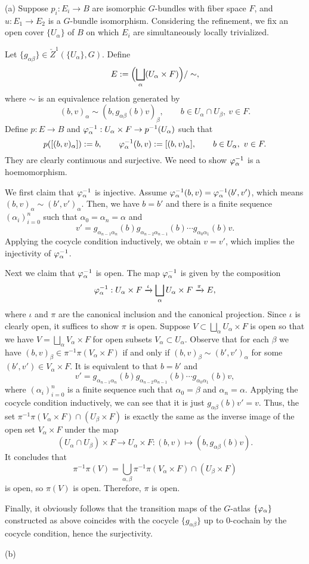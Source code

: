 \documentclass{../../large}
\begin{document}
\begin{pf}
(a)
Suppose $p_i:E_i\to B$ are isomorphic $G$-bundles with fiber space $F$, and $u:E_1\to E_2$ is a $G$-bundle isomorphism.
Considering the refinement, we fix an open cover $\{U_\alpha\}$ of $B$ on which $E_i$ are simultaneously locally trivialized.

Let $\{g_{\alpha\beta}\}\in\check Z^1(\{U_\alpha\},G)$.
Define
\[E:=\Bigl(\bigsqcup_\alpha(U_\alpha\times F)\Bigr)/\sim,\]
where $\sim$ is an equivalence relation generated by
\[(b,v)_\alpha\sim(b,g_{\alpha\beta}(b)v)_\beta,
\qquad b\in U_\alpha\cap U_\beta,\ v\in F.\]
Define $p:E\to B$ and $\varphi_\alpha^{-1}:U_\alpha\times F\to p^{-1}(U_\alpha)$ such that
\[p([(b,v)_\alpha]):=b,\qquad\varphi_\alpha^{-1}(b,v):=[(b,v)_\alpha],\qquad b\in U_\alpha,\ v\in F.\]
They are clearly continuous and surjective.
We need to show $\varphi_\alpha^{-1}$ is a hoemomorphism.

We first claim that $\varphi_\alpha^{-1}$ is injective.
Assume $\varphi_\alpha^{-1}(b,v)=\varphi_\alpha^{-1}(b',v')$, which means $(b,v)_\alpha\sim(b',v')_\alpha$.
Then, we have $b=b'$ and there is a finite sequence $(\alpha_i)_{i=0}^n$ such that $\alpha_0=\alpha_n=\alpha$ and
\[v'=g_{\alpha_{n-1}\alpha_n}(b)g_{\alpha_{n-2}\alpha_{n-1}}(b)\cdots g_{\alpha_0\alpha_1}(b)v.\]
Applying the cocycle condition inductively, we obtain $v=v'$, which implies the injectivity of $\varphi_\alpha^{-1}$.

Next we claim that $\varphi_\alpha^{-1}$ is open.
The map $\varphi_\alpha^{-1}$ is given by the composition
\[\varphi_\alpha^{-1}:U_\alpha\times F\xrightarrow{\iota}\bigsqcup_\alpha U_\alpha\times F\xrightarrow{\pi}E,\]
where $\iota$ and $\pi$ are the canonical inclusion and the canonical projection.
Since $\iota$ is clearly open, it suffices to show $\pi$ is open.
Suppose $V\subset\bigsqcup_\alpha U_\alpha\times F$ is open so that we have $V=\bigsqcup_\alpha V_\alpha\times F$ for open subsets $V_\alpha\subset U_\alpha$.
Observe that for each $\beta$ we have $(b,v)_\beta\in\pi^{-1}\pi(V_\alpha\times F)$ if and only if $(b,v)_\beta\sim(b',v')_\alpha$ for some $(b',v')\in V_\alpha\times F$.
It is equivalent to that $b=b'$ and 
\[v'=g_{\alpha_{n-1}\alpha_n}(b)g_{\alpha_{n-2}\alpha_{n-1}}(b)\cdots g_{\alpha_0\alpha_1}(b)v,\]
where $(\alpha_i)_{i=0}^n$ is a finite sequence such that $\alpha_0=\beta$ and $\alpha_n=\alpha$.
Applying the cocycle condition inductively, we can see that it is just $g_{\alpha\beta}(b)v'=v$.
Thus, the set $\pi^{-1}\pi(V_\alpha\times F)\cap(U_\beta\times F)$ is exactly the same as the inverse image of the open set $V_\alpha\times F$ under the map
\[(U_\alpha\cap U_\beta)\times F\to U_\alpha\times F:(b,v)\mapsto(b,g_{\alpha\beta}(b)v).\]
It concludes that
\[\pi^{-1}\pi(V)=\bigcup_{\alpha,\beta}\pi^{-1}\pi(V_\alpha\times F)\cap(U_\beta\times F)\]
is open, so $\pi(V)$ is open.
Therefore, $\pi$ is open.

Finally, it obviously follows that the transition maps of the $G$-atlas $\{\varphi_\alpha\}$ constructed as above coincides with the cocycle $\{g_{\alpha\beta}\}$ up to 0-cochain by the cocycle condition, hence the surjectivity.

(b)
\end{pf}
\end{document}

